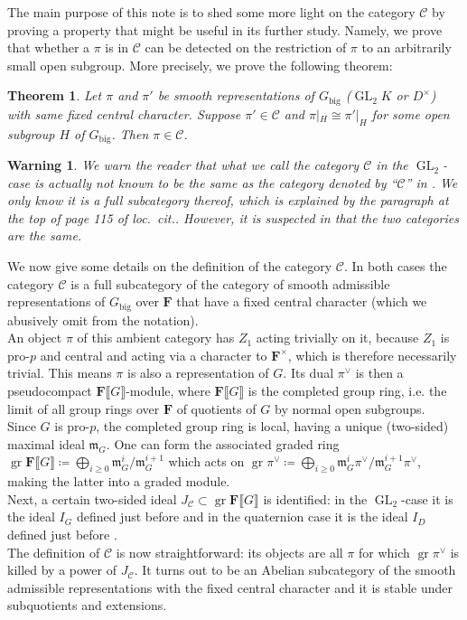 \documentclass[11pt, oneside]{article}
\DeclareMathOperator{\GL}{GL}
\DeclareMathOperator{\gr}{gr}
\newtheorem{theorem}{Theorem}
\newtheorem{warning}{Warning}
\theoremstyle{definition}
\begin{document}
	The main purpose of this note is to shed some more light on the category $\mathcal C$ by proving a property that might be useful in its further study. Namely, we prove that whether a $\pi$ is in $\mathcal C$ can be detected on the restriction of $\pi$ to an arbitrarily small open subgroup. More precisely, we prove the following theorem:
	\begin{theorem}\label{main}
		Let $\pi$ and $\pi'$ be smooth representations of $G_\text{big}$ ($\GL_2K$ or $D^\times$) with same fixed central character. Suppose $\pi'\in\mathcal C$ and $\pi|_H\cong\pi'|_H$ for some open subgroup $H$ of $G_\text{big}$. Then $\pi\in\mathcal C$.
	\end{theorem}
	\begin{warning}
		We warn the reader that what we call the category $\mathcal C$ in the $\GL_2$-case is actually not known to be the same as the category denoted by ``\hspace{0.25em}$\mathcal C$'' in \cite{BHHMSConjs}. We only know it is a full subcategory thereof, which is explained by the paragraph at the top of page 115 of \emph{loc.~cit.}. However, it is suspected in \cite[Rem.~3.3.2.6(ii)]{BHHMSConjs} that the two categories are the same.
	\end{warning}
	We now give some details on the definition of the category $\mathcal C$. In both cases the category $\mathcal C$ is a full subcategory of the category of smooth admissible representations of $G_\text{big}$ over $\mathbf F$ that have a fixed central character (which we abusively omit from the notation).\\
	An object $\pi$ of this ambient category has $Z_1$ acting trivially on it, because $Z_1$ is pro-$p$ and central and acting via a character to $\mathbf F^\times$, which is therefore necessarily trivial. This means $\pi$ is also a representation of $G$. Its dual $\pi^\vee$ is then a pseudocompact $\mathbf F\llbracket G\rrbracket$-module, where $\mathbf F\llbracket G\rrbracket$ is the completed group ring, i.e. the limit of all group rings over $\mathbf F$ of quotients of $G$ by normal open subgroups.\\
	Since $G$ is pro-$p$, the completed group ring is local, having a unique (two-sided) maximal ideal $\mathfrak m_G$. One can form the associated graded ring $\gr\mathbf F\llbracket G\rrbracket\coloneqq\bigoplus_{i\geq0}\mathfrak m_G^i/\mathfrak m_G^{i+1}$ which acts on $\gr\pi^\vee\coloneqq\bigoplus_{i\geq0}\mathfrak m_G^i\pi^\vee/\mathfrak m_G^{i+1}\pi^\vee$, making the latter into a graded module.\\
	Next, a certain two-sided ideal $J_{\mathcal C}\subset\gr\mathbf F\llbracket G\rrbracket$ is identified: in the $\GL_2$-case it is the ideal $I_G$ defined just before \cite[Thm.~5.3.4]{BHHMS1} and in the quaternion case it is the ideal $I_D$ defined just before \cite[Cor.~2.10]{hu2024modprepresentationsquaternion}.\\
	The definition of $\mathcal C$ is now straightforward: its objects are all $\pi$ for which $\gr\pi^\vee$ is killed by a power of $J_{\mathcal C}$. It turns out to be an Abelian subcategory of the smooth admissible representations with the fixed central character and it is stable under subquotients and extensions.\\
	
\end{document}
